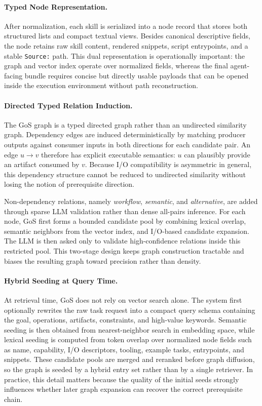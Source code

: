 \paragraph{Typed Node Representation.}
After normalization, each skill is serialized into a node record that stores both structured lists and compact textual views. Besides canonical descriptive fields, the node retains raw skill content, rendered snippets, script entrypoints, and a stable \texttt{Source:} path. This dual representation is operationally important: the graph and vector index operate over normalized fields, whereas the final agent-facing bundle requires concise but directly usable payloads that can be opened inside the execution environment without path reconstruction.

\paragraph{Directed Typed Relation Induction.}
The GoS graph is a typed directed graph rather than an undirected similarity graph. Dependency edges are induced deterministically by matching producer outputs against consumer inputs in both directions for each candidate pair. An edge $u \rightarrow v$ therefore has explicit executable semantics: $u$ can plausibly provide an artifact consumed by $v$. Because I/O compatibility is asymmetric in general, this dependency structure cannot be reduced to undirected similarity without losing the notion of prerequisite direction.

Non-dependency relations, namely \emph{workflow}, \emph{semantic}, and \emph{alternative}, are added through sparse LLM validation rather than dense all-pairs inference. For each node, GoS first forms a bounded candidate pool by combining lexical overlap, semantic neighbors from the vector index, and I/O-based candidate expansion. The LLM is then asked only to validate high-confidence relations inside this restricted pool. This two-stage design keeps graph construction tractable and biases the resulting graph toward precision rather than density.

\paragraph{Hybrid Seeding at Query Time.}
At retrieval time, GoS does not rely on vector search alone. The system first optionally rewrites the raw task request into a compact query schema containing the goal, operations, artifacts, constraints, and high-value keywords. Semantic seeding is then obtained from nearest-neighbor search in embedding space, while lexical seeding is computed from token overlap over normalized node fields such as name, capability, I/O descriptors, tooling, example tasks, entrypoints, and snippets. These candidate pools are merged and reranked before graph diffusion, so the graph is seeded by a hybrid entry set rather than by a single retriever. In practice, this detail matters because the quality of the initial seeds strongly influences whether later graph expansion can recover the correct prerequisite chain.

